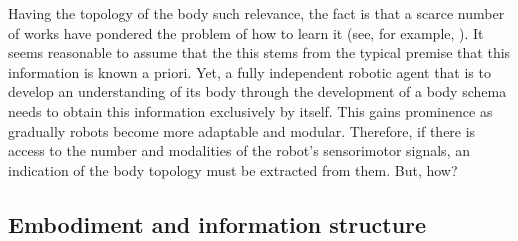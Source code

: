 Having the topology of the body such relevance, the fact is that a scarce number of works have pondered the problem of how to learn it (see, for example, \cite{Bongard2006Resilientmachinescontinuous}). It seems reasonable to assume that the this stems from the typical premise that this information is known a priori. Yet, a fully independent robotic agent that is to develop an understanding of its body through the development of a body schema needs to obtain this information exclusively by itself. This gains prominence as gradually robots become more adaptable and modular. Therefore, if there is access to the number and modalities of the robot's sensorimotor signals, an indication of the body topology must be extracted from them. But, how?

\subsection{Embodiment and information structure}\label{sec:embodiment_and_information}
%
